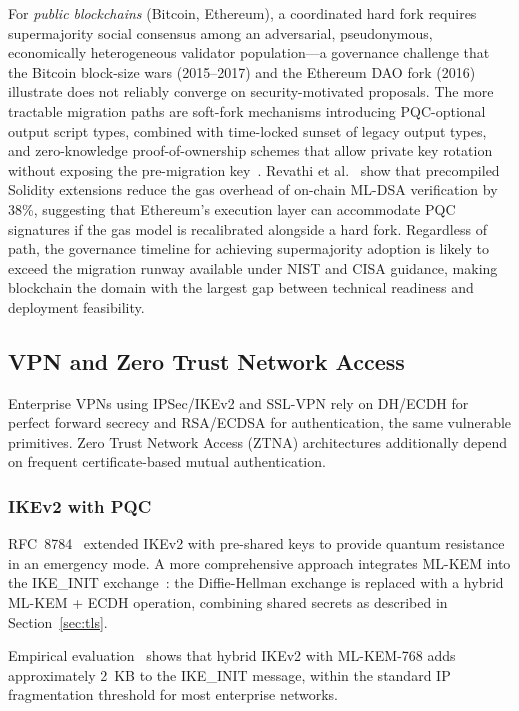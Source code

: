 \documentclass[journal]{IEEEtran}
\begin{document}
For \emph{public blockchains} (Bitcoin, Ethereum), a coordinated hard
fork requires supermajority social consensus among an adversarial,
pseudonymous, economically heterogeneous validator population---a
governance challenge that the Bitcoin block-size wars (2015--2017) and
the Ethereum DAO fork (2016) illustrate does not reliably converge on
security-motivated proposals. The more tractable migration paths are
soft-fork mechanisms introducing PQC-optional output script types,
combined with time-locked sunset of legacy output types, and
zero-knowledge proof-of-ownership schemes that allow private key rotation
without exposing the pre-migration key~\cite{gharavi2024postquantum}.
Revathi et al.~\cite{revathi2025enhancing} show that precompiled Solidity
extensions reduce the gas overhead of on-chain ML-DSA verification by
38\%, suggesting that Ethereum's execution layer can accommodate PQC
signatures if the gas model is recalibrated alongside a hard fork.
Regardless of path, the governance timeline for achieving supermajority
adoption is likely to exceed the migration runway available under NIST
and CISA guidance, making blockchain the domain with the largest gap
between technical readiness and deployment feasibility.

\subsection{VPN and Zero Trust Network Access}
\label{sec:vpn}

Enterprise VPNs using IPSec/IKEv2 and SSL-VPN rely on DH/ECDH for perfect
forward secrecy and RSA/ECDSA for authentication, the same vulnerable
primitives. Zero Trust Network Access (ZTNA) architectures additionally depend
on frequent certificate-based mutual authentication.

\subsubsection{IKEv2 with PQC}

RFC~8784~\cite{rfc8784} extended IKEv2 with pre-shared keys to provide
quantum resistance in an emergency mode. A more comprehensive approach
integrates ML-KEM into the IKE\_INIT exchange~\cite{rfc8784}:
the Diffie-Hellman exchange is replaced with a hybrid ML-KEM + ECDH operation,
combining shared secrets as described in Section~\ref{sec:tls}.

Empirical evaluation~\cite{sikeridis2020pqc} shows that hybrid IKEv2 with
ML-KEM-768 adds approximately 2~KB to the IKE\_INIT message, within the
standard IP fragmentation threshold for most enterprise networks.
\end{document}
